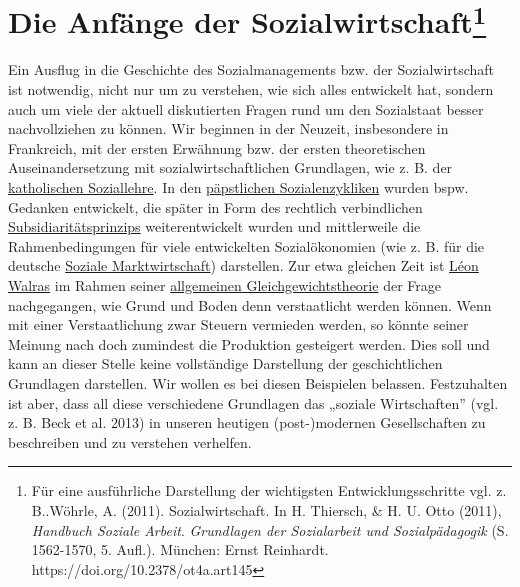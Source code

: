 \documentclass[
  letterpaper,
]{book}
\begin{document}
\section[Die Anfänge der Sozialwirtschaft]{\texorpdfstring{Die Anfänge
der
Sozialwirtschaft\footnote{Für eine ausführliche Darstellung der
  wichtigsten Entwicklungsschritte vgl. z. B..Wöhrle, A. (2011).
  Sozialwirtschaft. In H. Thiersch, \& H. U. Otto (2011), \emph{Handbuch
  Soziale Arbeit}. \emph{Grundlagen der Sozialarbeit und
  Sozialpädagogik} (S. 1562-1570, 5. Aufl.). München: Ernst Reinhardt.
  https://doi.org/10.2378/ot4a.art145}}{Die Anfänge der Sozialwirtschaft}}\label{die-anfaenge-der-sozialwirtschaft}

Ein Ausflug in die Geschichte des Sozialmanagements bzw. der
Sozialwirtschaft ist notwendig, nicht nur um zu verstehen, wie sich
alles entwickelt hat, sondern auch um viele der aktuell diskutierten
Fragen rund um den Sozialstaat besser nachvollziehen zu können. Wir
beginnen in der Neuzeit, insbesondere in Frankreich, mit der ersten
Erwähnung bzw. der ersten theoretischen Auseinandersetzung mit
sozialwirtschaftlichen Grundlagen, wie z. B. der
\href{https://de.wikipedia.org/wiki/Katholische_Soziallehre}{katholischen
Soziallehre}. In den
\href{https://de.wikipedia.org/wiki/Sozialenzyklika}{päpstlichen
Sozialenzykliken} wurden bspw. Gedanken entwickelt, die später in Form
des rechtlich verbindlichen
\href{https://www.bpb.de/kurz-knapp/lexika/pocket-europa/16951/subsidiaritaetsprinzip/}{Subsidiaritätsprinzips}
weiterentwickelt wurden und mittlerweile die Rahmenbedingungen für viele
entwickelten Sozialökonomien (wie z. B. für die deutsche
\href{https://www.bpb.de/kurz-knapp/lexika/lexikon-der-wirtschaft/20642/soziale-marktwirtschaft/}{Soziale
Marktwirtschaft}) darstellen. Zur etwa gleichen Zeit ist
\href{https://de.wikipedia.org/wiki/L\%C3\%A9on_Walras}{Léon Walras} im
Rahmen seiner
\href{https://de.wikipedia.org/wiki/Walrasianisches_allgemeines_Gleichgewichtsmodell}{allgemeinen
Gleichgewichtstheorie} der Frage nachgegangen, wie Grund und Boden denn
verstaatlicht werden können. Wenn mit einer Verstaatlichung zwar Steuern
vermieden werden, so könnte seiner Meinung nach doch zumindest die
Produktion gesteigert werden. Dies soll und kann an dieser Stelle keine
vollständige Darstellung der geschichtlichen Grundlagen darstellen. Wir
wollen es bei diesen Beispielen belassen. Festzuhalten ist aber, dass
all diese verschiedene Grundlagen das „soziale Wirtschaften'' (vgl. z.
B. Beck et al. 2013) in unseren heutigen (post-)modernen Gesellschaften
zu beschreiben und zu verstehen verhelfen.
\end{document}
